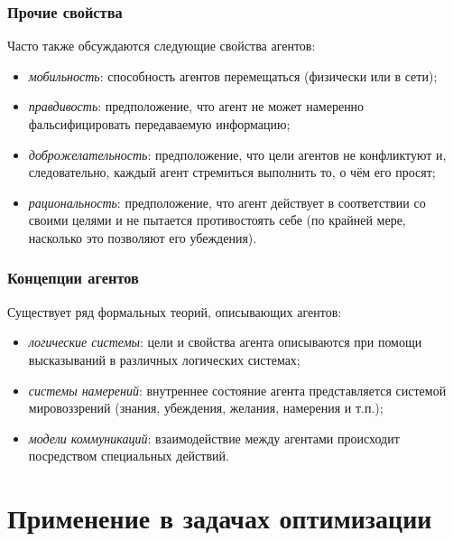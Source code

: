 \documentclass{beamer}
\begin{document}
\begin{frame}
  \frametitle{Прочие свойства}
  Часто также обсуждаются следующие свойства агентов:

  \begin{itemize}
    \item<1-> {\it мобильность}: способность агентов перемещаться (физически или в сети);
    \item<2-> {\it правдивость}: предположение, что агент не может намеренно фальсифицировать передаваемую информацию;
    \item<3-> {\it доброжелательность}: предположение, что цели агентов не конфликтуют и, следовательно, каждый агент
      стремиться выполнить то, о чём его просят;
    \item<4-> {\it рациональность}: предположение, что агент действует в соответствии со своими целями и не пытается
      противостоять себе (по крайней мере, насколько это позволяют его убеждения).
  \end{itemize}
\end{frame}

\begin{frame}
  \frametitle{Концепции агентов}
  Существует ряд формальных теорий, описывающих агентов:

  \begin{itemize}
    \item {\it логические системы}:
      цели и свойства агента описываются при помощи высказываний
      в различных логических системах;
    \item {\it системы намерений}:
      внутреннее состояние агента представляется системой
      мировоззрений (знания, убеждения, желания, намерения и т.п.);
    \item {\it модели коммуникаций}:
      взаимодействие между агентами происходит посредством специальных
      действий.
  \end{itemize}
\end{frame}

\section{Применение в задачах оптимизации}
\end{document}
